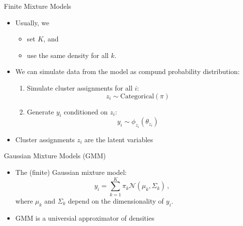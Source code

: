 \documentclass[10pt]{beamer}
\begin{document}
\begin{frame}{Finite Mixture Models}

\begin{itemize}
\item Usually, we
\begin{itemize}
\item set $K$, and
\item use the same density for all $k$.
\end{itemize}
\pause
\item We can simulate data from the model as {\color{uured} compund probability distribution}:
\begin{enumerate}
\item Simulate cluster assignments for all $i$:
\[
z_i \sim \text{Categorical}(\pi)
\]
\pause
\item Generate $y_i$ conditioned on $z_i$:
\[
y_i \sim \phi_{z_i}(\theta_{z_i})
\]
\end{enumerate}
\pause
\item Cluster assignments $z_i$ are the {\color{uured} latent variables}
\end{itemize}

\end{frame}

\begin{frame}{Gaussian Mixture Models (GMM)}

\begin{itemize}
\item The (finite) Gaussian mixture model:
\[
y_i = \sum_{k=1}^K \pi_k \mathcal{N}(\mu_k, \Sigma_k)\,,
\]
where $\mu_k$ and $\Sigma_k$ depend on the dimensionality of $y_i$.\pause
\item GMM is a {\color{uured} universial approximator} of densities
\end{itemize}

\end{frame}
\end{document}
